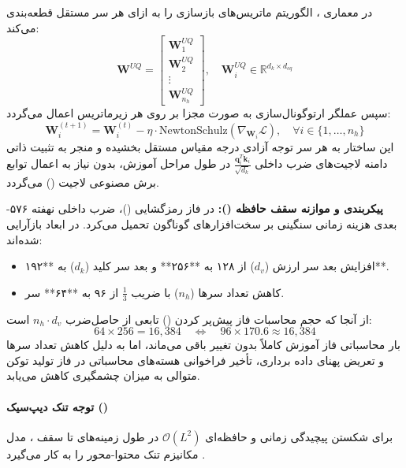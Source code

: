 در معماری ، الگوریتم  ماتریس‌های بازسازی را به ازای هر سر مستقل قطعه‌بندی می‌کند:
\begin{equation}
    \mathbf{W}^{UQ} = \begin{bmatrix} \mathbf{W}_1^{UQ} \\ \mathbf{W}_2^{UQ} \\ \vdots \\ \mathbf{W}_{n_h}^{UQ} \end{bmatrix}, \quad \mathbf{W}_i^{UQ} \in \mathbb{R}^{d_k \times d_{cq}}
\end{equation}
سپس عملگر ارتوگونال‌سازی به صورت مجزا بر روی هر زیرماتریس اعمال می‌گردد:
\begin{equation}
    \mathbf{W}_i^{(t+1)} = \mathbf{W}_i^{(t)} - \eta \cdot \text{NewtonSchulz}\left(\nabla_{\mathbf{W}_i} \mathcal{L}\right), \quad \forall i \in \{1, \dots, n_h\}
\end{equation}
این ساختار به هر سر توجه آزادی درجه مقیاس مستقل بخشیده و منجر به تثبیت ذاتی دامنه لاجیت‌های ضرب داخلی $\frac{\mathbf{q}_i^T \mathbf{k}_i}{\sqrt{d_k}}$ در طول مراحل آموزش، بدون نیاز به اعمال توابع برش مصنوعی لاجیت () می‌گردد.

\textbf{پیکربندی  و موازنه سقف حافظه ():}
در فاز رمزگشایی ()، ضرب داخلی نهفته ۵۷۶-بعدی هزینه زمانی سنگینی بر سخت‌افزارهای گوناگون تحمیل می‌کرد. در  ابعاد بازآرایی شده‌اند:
\begin{itemize}
    \item افزایش بعد سر ارزش ($d_v$) از ۱۲۸ به **۲۵۶** و بعد سر کلید ($d_k$) به **۱۹۲**.
    \item کاهش تعداد سرها ($n_h$) با ضریب $\frac{1}{3}$ از ۹۶ به **۶۴** سر.
\end{itemize}
از آنجا که حجم محاسبات فاز پیش‌پر کردن () تابعی از حاصل‌ضرب $n_h \cdot d_v$ است:
\begin{equation}
    64 \times 256 = 16,384 \quad \Longleftrightarrow \quad 96 \times 170.6 \approx 16,384
\end{equation}
بار محاسباتی فاز آموزش کاملاً بدون تغییر باقی می‌ماند، اما به دلیل کاهش تعداد سرها و تعریض پهنای داده برداری، تأخیر فراخوانی هسته‌های محاسباتی در فاز تولید توکن متوالی به میزان چشمگیری کاهش می‌یابد.

\paragraph*{توجه تنک دیپ‌سیک ()}
برای شکستن پیچیدگی زمانی و حافظه‌ای $\mathcal{O}(L^2)$ در طول زمینه‌های تا سقف ، مدل  مکانیزم تنک محتوا-محور  را به کار می‌گیرد \cite{deepseek2025v32}.

